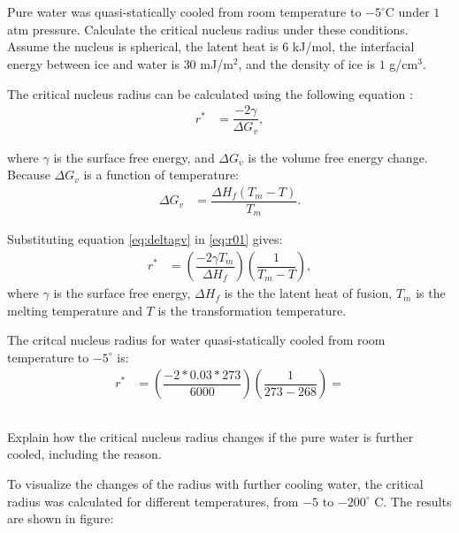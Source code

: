 \newpage
\section{}

\subsection{}
Pure water was quasi-statically cooled from room temperature to $-5^{\circ}$C under $1$ atm pressure. Calculate the critical nucleus radius under these conditions. Assume the nucleus is spherical, the latent heat is $6$ kJ/mol, the interfacial energy between ice and water is $30$ mJ/m$^2$, and the density of ice is $1$ g/cm$^3$.

The critical nucleus radius can be calculated using the following equation \citet{callister2010materials}: 
\begin{align}
  \label{eq:r01}
  r^*&=\dfrac{-2\gamma}{\Delta G_v},
\end{align}

where $\gamma$ is the surface free energy, and $\Delta G_v$ is the volume free energy change. Because $\Delta G_v$ is a function of temperature:
\begin{align}
  \label{eq:deltagv}
  \Delta G_v&= \dfrac{\Delta H_f\left(T_m-T\right)}{T_m}.
\end{align}

Substituting equation \ref{eq:deltagv} in \ref{eq:r01} gives: 
\begin{align}
  \label{eq:nucleus_radius}
  r^*&=\left(\dfrac{-2\gamma T_m}{\Delta H_f}\right)\left(\dfrac{1}{T_m - T}\right),
\end{align}
where $\gamma$ is the surface free energy, $\Delta H_f$ is the the latent heat of fusion, $T_m$ is the melting temperature and $T$ is the transformation temperature.

The critcal nucleus radius for water quasi-statically cooled from room temperature to $-5^{\circ}$ is:
\begin{align}
  \label{eq:radius}
  r^*&=\left(\dfrac{-2*0.03*273}{6000}\right)\left(\dfrac{1}{273-268}\right)=
\end{align}


\subsection{}
Explain how the critical nucleus radius changes if the pure water is
further cooled, including the reason.

To visualize the changes of the radius with further cooling water, the critical radius was calculated for different temperatures, from $-5$ to $-200^{\circ}$ C. The results are shown in figure: 